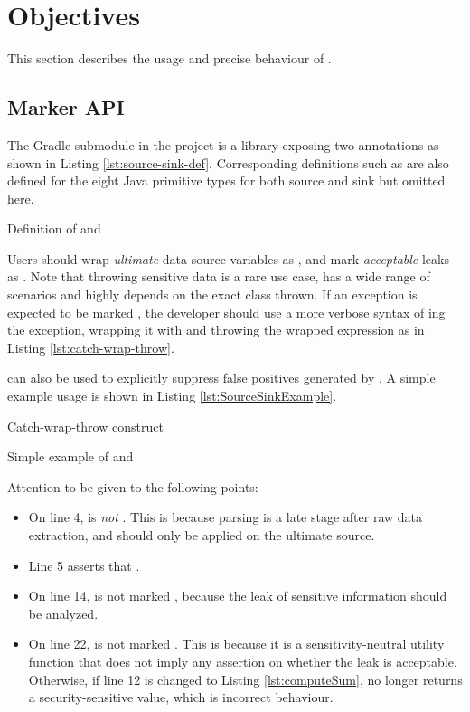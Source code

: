 \section{Objectives}
This section describes the usage and precise behaviour of \pname{}.

\subsection{Marker API}
The  Gradle submodule in the project
is a  library exposing two annotations
as shown in Listing \ref{lst:source-sink-def}.
Corresponding definitions such as 
are also defined for the eight Java primitive types
for both source and sink but omitted here.

{Definition of  and }

Users should wrap \emph{ultimate} data source variables as ,
and mark \emph{acceptable} leaks as .
Note that throwing sensitive data is a rare use case,
has a wide range of scenarios
and highly depends on the exact class thrown.
If an exception is expected to be marked ,
the developer should use a more verbose syntax of ing the exception,
wrapping it with  and throwing the wrapped expression as in Listing \ref{lst:catch-wrap-throw}.

 can also be used to explicitly suppress false positives generated by \pname{}.
A simple example usage is shown in Listing \ref{lst:SourceSinkExample}.

{Catch-wrap-throw construct}


{Simple example of  and }

Attention to be given to the following points:
\begin{itemize}
	\item On line 4,  is \emph{not} .
		This is because parsing is a late stage after raw data extraction,
		and  should only be applied on the ultimate source.
	\item Line 5 asserts that .
	\item On line 14,  is not marked ,
		because the leak of sensitive information should be analyzed.
	\item On line 22,  is not marked .
		This is because it is a sensitivity-neutral utility function
		that does not imply any assertion on whether the leak is acceptable.
		Otherwise, if line 12 is changed to Listing \ref{lst:computeSum},
		 no longer returns a security-sensitive value,
		which is incorrect behaviour.
\end{itemize}

